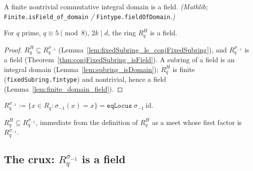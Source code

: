 \begin{lemma}\label{lem:finite_domain_field}
A finite nontrivial commutative integral domain is a field. \emph{(Mathlib;}
\texttt{Finite.isField\_of\_domain} \emph{/} \texttt{Fintype.fieldOfDomain}.\emph{)}
\end{lemma}

\begin{theorem}[$R_q^H$ is a field]\label{thm:fixedSubring_isField}
For $q$ prime, $q \equiv 5 \pmod 8$, $2k \mid d$, the ring $R_q^H$ is a field.
\end{theorem}

\begin{proof}
$R_q^H \subseteq R_q^{\sigma_{-1}}$ (Lemma~\ref{lem:fixedSubring_le_conjFixedSubring}), and
$R_q^{\sigma_{-1}}$ is a field (Theorem~\ref{thm:conjFixedSubring_isField}). A subring of a field
is an integral domain (Lemma~\ref{lem:subring_isDomain}); $R_q^H$ is finite
(\texttt{fixedSubring.fintype}) and nontrivial, hence a field
(Lemma~\ref{lem:finite_domain_field}).
\end{proof}

\begin{definition}\label{def:conjFixedSubring}
$R_q^{\sigma_{-1}} := \{x \in R_q : \sigma_{-1}(x) = x\} = \texttt{eqLocus}\ \sigma_{-1}\ \mathrm{id}$.
\end{definition}

\begin{lemma}[$R_q^H \le R_q^{\sigma_{-1}}$]\label{lem:fixedSubring_le_conjFixedSubring}
$R_q^H \subseteq R_q^{\sigma_{-1}}$, immediate from the definition of $R_q^H$ as a meet whose first
factor is $R_q^{\sigma_{-1}}$.
\end{lemma}

\subsection{The crux: $R_q^{\sigma_{-1}}$ is a field}

